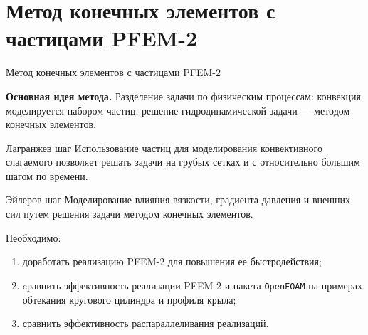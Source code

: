 \documentclass[9pt, ignoreonframetext,unicode]{beamer}
\begin{document}
\section{Метод конечных элементов с частицами PFEM-2}
\begin{frame}{Метод конечных элементов с частицами PFEM-2}
\begin{block}{}
\textbf{Основная идея метода.} Разделение задачи по физическим процессам: конвекция моделируется набором частиц, решение гидродинамической задачи --- методом конечных элементов.
\end{block}
		\begin{block}{Лагранжев шаг}
			Использование частиц для моделирования конвективного слагаемого позволяет решать задачи на грубых сетках и с относительно большим шагом по времени.
		\end{block}
		\begin{block}{Эйлеров шаг}
			Моделирование влияния вязкости, градиента давления и внешних сил путем решения задачи
методом конечных элементов.
			\end{block}




Необходимо:
\begin{enumerate}
	\item доработать реализацию PFEM-2 для повышения ее быстродействия;
	\item cравнить эффективность реализации PFEM-2 и пакета \texttt{OpenFOAM} на примерах обтекания кругового цилиндра и профиля крыла;	
	\item сравнить эффективность распараллеливания реализаций.
\end{enumerate}

\end{frame}
\end{document}
